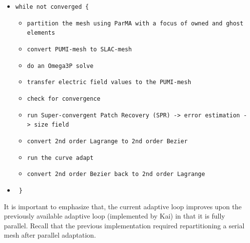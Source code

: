 \documentclass[review,12pt]{elsarticle_summary_report}
\begin{document}
\begin{itemize}
  \item[] \texttt{while not converged \{ }
   \begin{itemize}
     \item \texttt{partition the mesh using ParMA with a focus of owned and ghost elements}
     \item \texttt{convert PUMI-mesh to SLAC-mesh}
     \item \texttt{do an Omega3P solve} 
     \item \texttt{transfer electric field values to the PUMI-mesh}
     \item \texttt{check for convergence}
     \item \texttt{run Super-convergent Patch Recovery (SPR) -> error estimation -> size field}
     \item \texttt{convert 2nd order Lagrange to 2nd order Bezier}
     \item \texttt{run the curve adapt}
     \item \texttt{convert 2nd order Bezier back to 2nd order Lagrange}
   \end{itemize}

 \item[] \texttt{  \} }
\end{itemize}
It is important to emphasize that, the current adaptive loop improves upon the previously available adaptive loop (implemented by Kai) in that it is fully parallel. Recall that the previous implementation required repartitioning a serial mesh after parallel adaptation.
\end{document}
